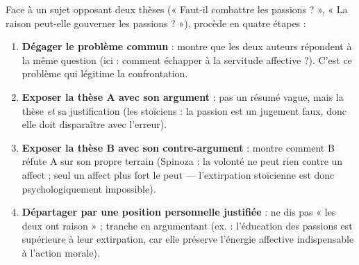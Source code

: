 \documentclass[11pt]{article}
\begin{document}
\begin{methode}
Face à un sujet opposant deux thèses (« Faut-il combattre les passions ? », « La raison peut-elle gouverner les passions ? »), procède en quatre étapes :
\begin{enumerate}
\item \textbf{Dégager le problème commun} : montre que les deux auteurs répondent à la même question (ici : comment échapper à la servitude affective ?). C'est ce problème qui légitime la confrontation.
\item \textbf{Exposer la thèse A avec son argument} : pas un résumé vague, mais la thèse \emph{et} sa justification (les stoïciens : la passion est un jugement faux, donc elle doit disparaître avec l'erreur).
\item \textbf{Exposer la thèse B avec son contre-argument} : montre comment B réfute A sur son propre terrain (Spinoza : la volonté ne peut rien contre un affect ; seul un affect plus fort le peut — l'extirpation stoïcienne est donc psychologiquement impossible).
\item \textbf{Départager par une position personnelle justifiée} : ne dis pas « les deux ont raison » ; tranche en argumentant (ex. : l'éducation des passions est supérieure à leur extirpation, car elle préserve l'énergie affective indispensable à l'action morale).
\end{enumerate}
\end{methode}
\end{document}
